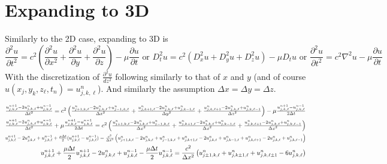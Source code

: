 \documentclass{article}
\begin{document}
\section{Expanding to 3D}
Similarly to the 2D case, expanding to 3D is
$$
	\frac{\partial^2 u}{\partial t^2} = c^2 \left(\frac{\partial^2 u}{\partial x^2} + \frac{\partial^2 u}{\partial y} + \frac{\partial^2 u}{\partial z} \right) - \mu \frac{\partial u}{\partial t} \text{ or } D_t^2 u = c^2 (D_x^2 u + D_y^2 u + D_z^2 u) - \mu D_t u \text{ or } \frac{\partial^2 u}{\partial t^2} = c^2 \nabla^2 u - \mu \frac{\partial u}{\partial t}
$$
With the discretization of $\frac{\partial^2 u}{d z^2}$ following similarly to that of $x$ and $y$ (and of course $u(x_j, y_k, z_\ell, t_n) = u_{j, k, \ell}^n$).  And similarly the assumption $\Delta x = \Delta y = \Delta z$.

$$
\begin{aligned}
\resizebox{1.35\textwidth}{!}{$\frac{u_{j, k, \ell}^{n+1} - 2u_{j,k,\ell}^n + u_{j,k,\ell}^{n-1}}{{\Delta t}^2} = c^2 \left(\frac{u_{j+1, k, \ell}^n - 2u_{j,k,\ell}^n + u_{j-1,k,\ell}^n}{{\Delta x}^2} + \frac{u_{j, k+1, \ell}^n - 2u_{j,k,\ell}^n + u_{j,k-1,\ell}^n}{{\Delta y}^2} + \frac{u_{j, k, \ell+1}^n - 2u_{j,k,\ell}^n + u_{j,k,\ell-1}^n}{{\Delta z}^2}\right) - \mu \frac{u_{j,k,\ell}^{n+1} - u_{j, k, \ell}^{n-1}}{2 \Delta t} $} \\
\resizebox{1.35\textwidth}{!}{$\frac{u_{j, k, \ell}^{n+1} - 2u_{j,k,\ell}^n + u_{j,k,\ell}^{n-1}}{{\Delta t}^2} + \mu \frac{u_{j,k,\ell}^{n+1} - u_{j, k, \ell}^{n-1}}{2 \Delta t}= c^2 \left(\frac{u_{j+1, k, \ell}^n - 2u_{j,k,\ell}^n + u_{j-1,k,\ell}^n}{{\Delta x}^2} + \frac{u_{j, k+1, \ell}^n - 2u_{j,k,\ell}^n + u_{j,k-1,\ell}^n}{{\Delta x}^2} + \frac{u_{j, k, \ell+1}^n - 2u_{j,k,\ell}^n + u_{j,k,\ell-1}^n}{{\Delta x}^2}\right) $} \\
\resizebox{1.35\textwidth}{!}{$ u_{j, k, \ell}^{n+1} - 2u_{j,k,\ell}^n + u_{j,k,\ell}^{n-1} + \frac{\mu \Delta t}{2} (u_{j,k,\ell}^{n+1} - u_{j, k, \ell}^{n-1})= \frac{c^2}{\Delta x^2} \left(u_{j+1, k, \ell}^n - 2u_{j,k,\ell}^n + u_{j-1,k,\ell}^n + u_{j, k+1, \ell}^n - 2u_{j,k,\ell}^n + u_{j,k-1,\ell}^n + u_{j, k, \ell+1}^n - 2u_{j,k,\ell}^n + u_{j,k,\ell-1}^n \right) $} \\
	u_{j, k, \ell}^{n+1} + \frac{\mu \Delta t}{2} u_{j,k,\ell}^{n+1} - 2u_{j,k,\ell}^n + u_{j,k,\ell}^{n-1} - \frac{\mu \Delta t}{2} u_{j, k, \ell}^{n-1} = \frac{c^2}{\Delta x^2} \left(u_{j \pm 1, k, \ell}^n + u_{j, k \pm 1, \ell}^n + u_{j, k, \ell \pm 1}^n - 6u_{j,k,\ell}^n  \right)  \\

\end{aligned}$$
\end{document}
